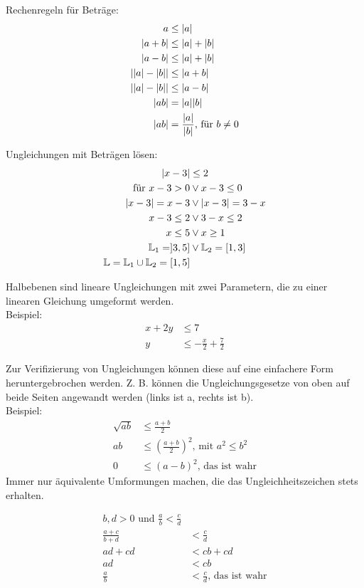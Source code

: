 \documentclass{standalone}
\begin{document}
Rechenregeln für Beträge:
\begin{align}
    a &\leq \lvert a\rvert \\
    \lvert a+b\rvert &\leq \lvert a\rvert + \lvert b\rvert \\
    \lvert a-b\rvert &\leq \lvert a\rvert + \lvert b\rvert \\
    \lvert\lvert a\rvert - \lvert b\rvert\rvert &\leq \lvert a+b\rvert \\
    \lvert\lvert a\rvert - \lvert b\rvert\rvert &\leq \lvert a-b\rvert \\
    \lvert ab\rvert &= \lvert a\rvert \lvert b\rvert \\
    \lvert ab\rvert &= \frac{\lvert a\rvert}{\lvert b\rvert}\text{, für } b \neq 0
\end{align}

Ungleichungen mit Beträgen lösen:
\begin{align}
    \lvert x-3\rvert &\leq 2 \\
    \text{für } x-3 > 0 &\vee x-3 \leq 0 \\
    \lvert x-3\rvert = x-3 &\vee \lvert x-3\rvert = 3-x \\
    x-3 \leq 2 &\vee 3-x \leq 2 \\
    x \leq 5 &\vee x \geq 1 \\
    \mathbb{L}_1 = ]3, 5] &\vee \mathbb{L}_2 = [1, 3] \\
    \mathbb{L} = \mathbb{L}_1 \cup \mathbb{L}_2 = [1,5]
\end{align}

Halbebenen sind lineare Ungleichungen mit zwei Parametern, die zu einer linearen Gleichung umgeformt werden.\\
Beispiel:
\begin{align}
    x +2y &\leq 7 \\
    y &\leq -\frac{x}{2} + \frac{7}{2}
\end{align}

Zur Verifizierung von Ungleichungen können diese auf eine einfachere Form heruntergebrochen werden.
Z. B. können die Ungleichungsgesetze von oben auf beide Seiten angewandt werden (links ist a, rechts ist b).\\
Beispiel:
\begin{align}
    \sqrt{ab} &\leq \frac{a+b}{2} \\
    ab &\leq (\frac{a+b}{2})^2 \text{, mit } a^2 \leq b^2\\
    0 &\leq (a-b)^2 \text{, das ist wahr}
\end{align}
Immer nur äquivalente Umformungen machen, die das Ungleichheitszeichen stets erhalten.

\begin{align}
    b,d > 0 \text{ und } \frac{a}{b} < \frac{c}{d} \\
    \frac{a+c}{b+d} &< \frac{c}{d} \\
    ad + cd &< cb + cd \\
    ad &< cb \\
    \frac{a}{b}&<\frac{c}{d}\text{, das ist wahr}
\end{align}
\end{document}
